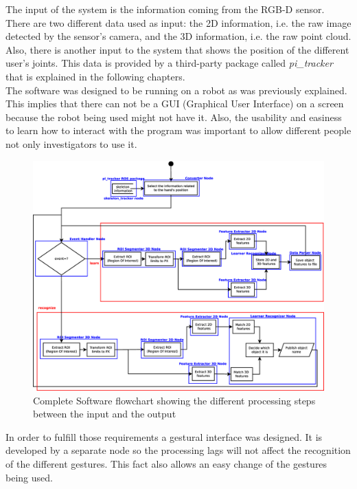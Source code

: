 The input of the system is the information coming from the RGB-D sensor. 
There are two different data used as input: the 2D information, i.e. the raw image detected by the sensor's camera, and the 3D information, i.e. the raw point cloud. 
Also, there is another input to the system that shows the position of the different user's joints. This data is provided by a third-party package called \textit{pi\_tracker} that is explained in the following chapters. 
\\

The software was designed to be running on a robot as was previously explained. This implies that there can not be a GUI (Graphical User Interface) on a screen because the robot being used might not have it. Also, the usability and easiness to learn how to interact with the program was important to allow different people not only investigators to use it. 
\\


\begin{figure}[H]
	\begin{center}
\includegraphics[scale=0.3]{img/diagrams/flowcharts.eps}
	\caption[Software flowchart]{Complete Software flowchart showing the different processing steps between the input and the output}
	\end{center}
\end{figure}


In order to fulfill those requirements a gestural interface was designed. It is developed by a separate node so the processing lags will not affect the recognition of the different gestures. This fact also allows an easy change of the gestures being used. 
\\

